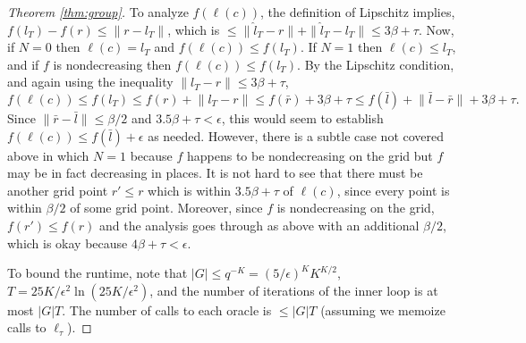 \documentclass[final, 12pt]{colt2018} %
\newcommand{\eps}{\epsilon}
\def\norm#1{\mathopen\| #1 \mathclose\|}%
\begin{document}
\begin{proof}[Theorem \ref{thm:group}]
To analyze $f(\ell(c))$, the definition of Lipschitz implies, $f(l_T) - f(r) \leq \norm{r-l_T}$, which is $\leq \|\hat{l}_T-r\| + \|\hat{l}_T - l_T\| \leq 3\beta + \tau$. Now, if $N=0$ then $\ell(c)=l_T$ and $f(\ell(c))\leq f(l_T)$. If $N=1$ then $\ell(c)\leq l_T$, and if $f$ is nondecreasing then $f(\ell(c)) \leq f(l_T)$. 
By the Lipschitz condition, and again using the inequality $\norm{l_T-r}\leq 3\beta+\tau$, 
$$f(\ell(c))\leq f(l_T) \leq f(r) + \norm{l_T-r} \leq f(\bar{r}) + 3\beta+\tau \leq f(\bar{l})+\norm{\bar{l}-\bar{r}} + 3\beta+\tau.$$
Since $\norm{\bar{r}-\bar{l}}\leq \beta/2$ and $3.5\beta+\tau<\eps$, this would seem to establish $f(\ell(c)) \leq f(\bar{l})+\eps$ as needed. However, there is a subtle case not covered above in which $N=1$ because $f$ happens to be nondecreasing on the grid but $f$ may be in fact decreasing in places. It is not hard to see that there must be another grid point $r'\leq r$ which is within $3.5\beta+\tau$ of $\ell(c)$, since every point is within $\beta/2$ of some grid point. Moreover, since $f$ is nondecreasing on the grid, $f(r')\leq f(r)$ and the analysis goes through as above with an additional $\beta/2$, which is okay because $4\beta + \tau < \eps$. 

To bound the runtime, note that $|G|\leq q^{-K} = (5/\eps)^K K^{K/2}$, $T = 25K/\eps^2\ln(25K/\eps^2)$, and the number of iterations of the inner loop is at most $|G|T$. The number of calls to each oracle is $\leq |G|T$ (assuming we memoize calls to $\ell_\tau$).
\end{proof}
\end{document}
